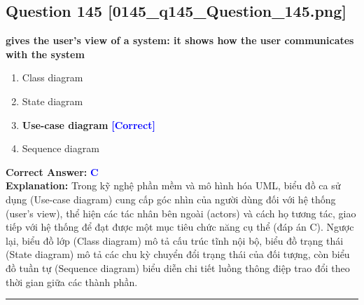 \documentclass[11pt,a4paper]{article}
\begin{document}
\begin{minipage}{\textwidth}
\subsection*{Question 145 \quad \footnotesize{[0145\_q145\_Question\_145.png]}}
\noindent \textbf{gives the user's view of a system: it shows how the user communicates with the system}

\begin{enumerate}[label=\Alph*.]
    \item Class diagram
    \item State diagram
    \item \textbf{Use-case diagram} \hfill \textcolor{blue}{\textbf{[Correct]}}
    \item Sequence diagram
\end{enumerate}

\noindent \textbf{Correct Answer:} \textcolor{blue}{\textbf{C}} \\[2pt]
\noindent \textbf{Explanation:} Trong kỹ nghệ phần mềm và mô hình hóa UML, biểu đồ ca sử dụng (Use-case diagram) cung cấp góc nhìn của người dùng đối với hệ thống (user's view), thể hiện các tác nhân bên ngoài (actors) và cách họ tương tác, giao tiếp với hệ thống để đạt được một mục tiêu chức năng cụ thể (đáp án C). Ngược lại, biểu đồ lớp (Class diagram) mô tả cấu trúc tĩnh nội bộ, biểu đồ trạng thái (State diagram) mô tả các chu kỳ chuyển đổi trạng thái của đối tượng, còn biểu đồ tuần tự (Sequence diagram) biểu diễn chi tiết luồng thông điệp trao đổi theo thời gian giữa các thành phần.

\par\vspace{0.3cm}
\hrule
\vspace{0.3cm}
\end{minipage}
\end{document}
